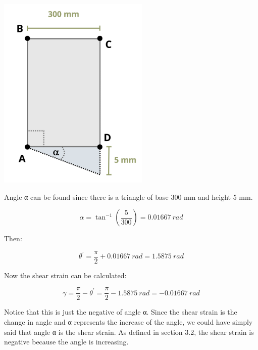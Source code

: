 \documentclass[
  letterpaper,
  DIV=11,
  numbers=noendperiod]{scrreprt}
\begin{document}
\begin{tcolorbox}
\begin{tcolorbox}
\begin{center}
\includegraphics[width=2.84375in,height=\textheight]{images/CH3 PNGs/example 3.3 part 2.png}
\end{center}

Angle α can be found since there is a triangle of base 300 mm and height
5 mm.

\[
\alpha=\tan ^{-1}\left(\frac{5}{300}\right)=0.01667 {~rad}
\]

Then:

\[
\theta^{\prime}=\frac{\pi}{2}+0.01667{~rad}=1.5875 {~rad}
\]

Now the shear strain can be calculated:

\[
\gamma=\frac{\pi}{2}-\theta^{\prime}=\frac{\pi}{2}-1.5875{~rad}=-0.01667 {~rad}
\]

Notice that this is just the negative of angle α. Since the shear strain
is the change in angle and α represents the increase of the angle, we
could have simply said that angle α is the shear strain. As defined in
section 3.2, the shear strain is negative because the angle is
increasing.

\end{tcolorbox}

\end{tcolorbox}
\end{document}
